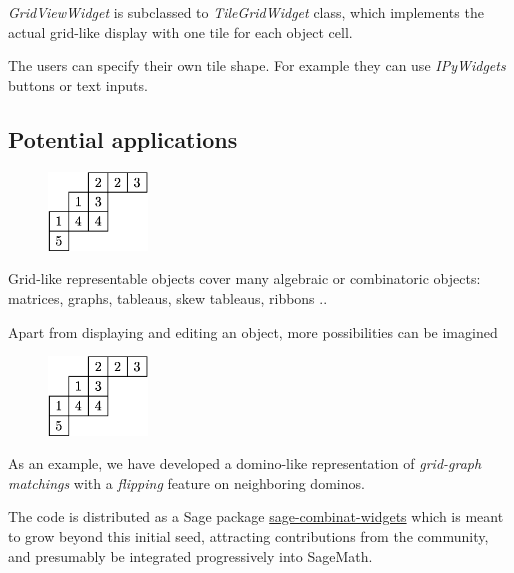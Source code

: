 \documentclass{deliverablereport}
\begin{document}
\emph{GridViewWidget} is subclassed to \emph{TileGridWidget} class,
which implements the actual grid-like display with one tile for each
object cell.

The users can specify their own tile shape. For example they can
use \emph{IPyWidgets} buttons or text inputs.

\subsection{Potential applications}

\begin{figure}
    \begin{center}
      \includegraphics[width=100px]{images/JDTSlide}
\end{center}
\end{figure}

Grid-like representable objects cover many algebraic or combinatoric
objects: matrices, graphs, tableaus, skew tableaus, ribbons ..

Apart from displaying and editing an object, more possibilities can be
imagined


\begin{figure}
    \begin{center}
      \includegraphics[width=100px]{images/JDTSlide}
\end{center}
\end{figure}

As an example, we have developed a domino-like representation of
\emph{grid-graph matchings} with a \emph{flipping} feature on neighboring dominos.


The code is distributed as a Sage package
\href{https://github.com/sagemath/sage-combinat-widgets/}{sage-combinat-widgets}
which is meant to grow beyond this initial seed, attracting
contributions from the community, and presumably be integrated
progressively into SageMath.
\end{document}

